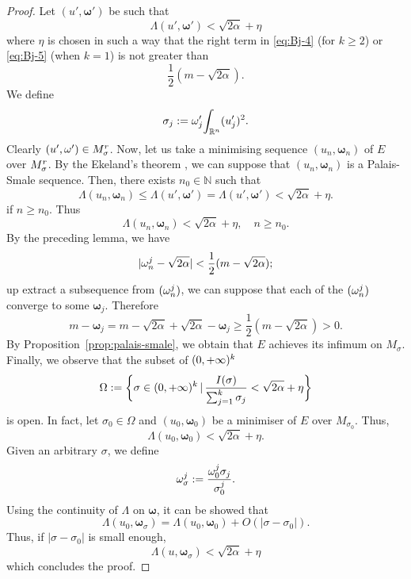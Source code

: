 \documentclass[a4paper,12pt,oneside]{amsart}
\theoremstyle{definition}
\theoremstyle{remark}
\theoremstyle{theorem}
\begin{document}
\begin{proof}
Let $ (u',{\mathbf{\omega}}') $ be such that 
\[
\Lambda(u',{\mathbf{\omega}}') < \sqrt{2\alpha} + \eta
\]
where $ \eta $ is chosen in such a way that the right term in \eqref{eq:Bj-4}
(for $ k\geq 2 $) or \eqref{eq:Bj-5} (when $ k = 1 $)
is not greater than
\[
\frac{1}{2}(m - \sqrt{2\alpha}).
\]
We define 
\[
{\sigma}_j := {\mathbf{\omega}}' _j {\int_{{\mathbb{R}}\sp{n}}} (u_j ')\sp 2.
\]
Clearly $ (u',{\mathbf{\omega}}')\in M_{\sigma}\sp r  $. Now, let us take a minimising sequence
$ (u_n,{\mathbf{\omega}}_n) $ of $ E $ over $ M_{\sigma}\sp r  $. By the
Ekeland's theorem \cite[Theorem~5.1,p.\,48]{Str90}, we can suppose
that $ (u_n,{\mathbf{\omega}}_n) $ is a Palais-Smale sequence.
Then, there exists $ n_0\in{\mathbb{{N}}} $ such that 
\[
\Lambda(u_n,{\mathbf{\omega}}_n) \leq \Lambda(u',{\mathbf{\omega}}') = 
\Lambda(u',{\mathbf{\omega}}') < \sqrt{2\alpha} + \eta.
\]
if $ n\geq n_0 $. Thus
\[
\Lambda(u_n,{\mathbf{\omega}}_n) < \sqrt{2\alpha} + \eta,\quad n\geq n_0.
\]
By the preceding lemma, we have 
\[
|{\mathbf{\omega}}_n \sp j - \sqrt{2\alpha}| < \frac{1}{2}(m - \sqrt{2\alpha});
\]
up extract a subsequence from $ ({\mathbf{\omega}}_n \sp j) $, we can suppose
that each of the $ ({\mathbf{\omega}}_n \sp j) $ converge to some $ {\mathbf{\omega}}_j $.
Therefore
\[
m - {\mathbf{\omega}}_j  = m - \sqrt{2\alpha} + \sqrt{2\alpha} - {\mathbf{\omega}}_j \geq
\frac{1}{2}(m - \sqrt{2\alpha}) > 0.
\]
By Proposition~\ref{prop:palais-smale}, we obtain that $ E $ achieves
its infimum on $ M_\sigma $. Finally, we observe that the subset of
$ (0,+\infty)\sp k $ 
\[
\Omega := 
\bigg\{\sigma\in (0,+\infty)\sp k\,|\,
\frac{I(\sigma)}{\sum_{j = 1} \sp k {\sigma}_j} < \sqrt{2\alpha} + \eta
\bigg\}
\]
is open. In fact, let $ {\sigma}_0\in\Omega $ and $ (u_0,{\mathbf{\omega}}_0) $ be 
a minimiser of $ E $ over $ M_{{\sigma}_0} $. Thus,
\[
\Lambda(u_0,{\mathbf{\omega}}_0) < \sqrt{2\alpha} + \eta.
\]
Given an arbitrary $ {\sigma} $, we define
\[
{\mathbf{\omega}}_{\sigma}\sp j := \frac{{\mathbf{\omega}}_0 \sp j {\sigma}_j}{{\sigma}_0 \sp j}.
\]
Using the continuity of $ \Lambda $ on $ {\mathbf{\omega}} $, it can be showed that
\[
\Lambda(u_0,{\mathbf{\omega}}_{\sigma}) = \Lambda(u_0,{\mathbf{\omega}}_0) + O(|{\sigma} - {\sigma}_0|).
\]
Thus, if $ |{\sigma} - {\sigma}_0| $ is small enough,
\[
\Lambda(u,{\mathbf{\omega}}_{\sigma}) < \sqrt{2\alpha} + \eta
\]
which concludes the proof.
\end{proof}
\end{document}
